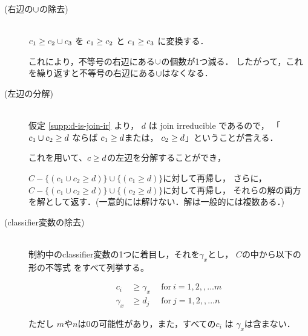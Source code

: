 \begin{description}
\item[(右辺の$\cup$の除去)]\mbox{}\\
  ${c_1} \ge {c_2 \cup c_3}$ を
  ${c_1} \ge {c_2}$ と
  ${c_1} \ge {c_3}$ に変換する．

  これにより，不等号の右辺にある$\cup$の個数が1つ減る．
  したがって，これを繰り返すと不等号の右辺にある$\cup$はなくなる．



\item[(左辺の分解)] \mbox{}\\
  仮定 \ref{supp:d-is-join-ir} より， $d$ は join irreducible であるので，
  「${c_1 \cup c_2} \ge {d}$ ならば
  ${c_1} \ge {d}$または，
  ${c_2} \ge {d}$」ということが言える．

  これを用いて、${c} \ge {d}$の左辺を分解することができ，

  $C - \{(c_1 \cup c_2 \ge d)\} \cup \{(c_1 \ge d)\}$に対して再帰し，
  さらに，
  $C - \{(c_1 \cup c_2 \ge d)\} \cup \{(c_2 \ge d)\}$に対して再帰し，
  それらの解の両方を解として返す．(一意的には解けない．解は一般的には複数ある．)




\item[(classifier変数の除去)]\mbox{}\\
  制約中のclassifier変数の1つに着目し，それを$\gamma_x$とし，
  $C$の中から以下の形の不等式
  をすべて列挙する。

  \begin{align*}
    c_i & \ge \gamma_x  ~~ & \text{for}~ i=1,2,,...m\\
    \gamma_x & \ge d_j  ~~ & \text{for}~ j=1,2,,...n
  \end{align*}

  ただし $m$や$n$は$0$の可能性があり，また，すべての$c_i$ は $\gamma_x$は含まない．


\end{description}
